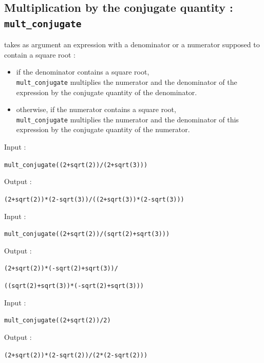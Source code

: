 \documentclass[a4paper,11pt]{book}
\begin{document}
\subsection{Multiplication by the conjugate quantity : 
{\tt mult\_conjugate}} 
 takes as argument an expression  with a 
denominator or a numerator supposed to contain a square root :
\begin{itemize}
\item if the denominator contains a square root,\\
{\tt mult\_conjugate} multiplies the numerator and the denominator
of the expression by the conjugate quantity of the denominator.
\item otherwise, if the numerator contains a square root,\\
{\tt mult\_conjugate} multiplies the numerator and the denominator of this 
expression by the  conjugate quantity of the numerator. 
\end{itemize}
Input :
\begin{center}{\tt mult\_conjugate((2+sqrt(2))/(2+sqrt(3)))}\end{center}
Output :
\begin{center}{\tt (2+sqrt(2))*(2-sqrt(3))/((2+sqrt(3))*(2-sqrt(3)))}\end{center}
Input :
\begin{center}{\tt mult\_conjugate((2+sqrt(2))/(sqrt(2)+sqrt(3)))}\end{center}
Output :
\begin{center}{\tt (2+sqrt(2))*(-sqrt(2)+sqrt(3))/}\end{center}
\begin{center}{\tt ((sqrt(2)+sqrt(3))*(-sqrt(2)+sqrt(3)))}\end{center}
Input :
\begin{center}{\tt mult\_conjugate((2+sqrt(2))/2)}\end{center}
Output :
\begin{center}{\tt (2+sqrt(2))*(2-sqrt(2))/(2*(2-sqrt(2)))}\end{center}
\end{document}
